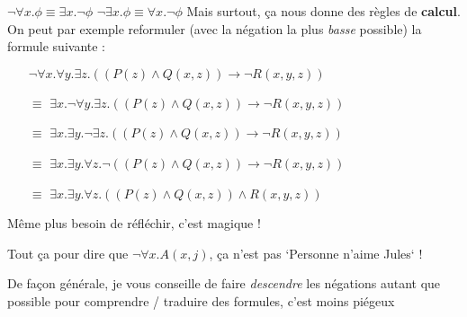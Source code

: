 \begin{frame}

$\neg \forall x. \phi \equiv \exists x. \neg \phi$\newline
$\neg \exists x. \phi \equiv \forall x. \neg \phi$\newline
\pause
Mais surtout, ça nous donne des règles de \textbf{calcul}. On peut par exemple reformuler (avec la négation la plus \textit{basse} possible) la formule suivante : 
\begin{itemize}
\item[] $\neg \forall x. \forall y. \exists z. ((P(z) \wedge Q(x,z)) \rightarrow \neg R(x,y,z))$\pause
\item[$\equiv$] $\exists x. \neg \forall y. \exists z. ((P(z) \wedge Q(x,z)) \rightarrow \neg R(x,y,z))$\pause
\item[$\equiv$] $\exists x. \exists y. \neg \exists z. ((P(z) \wedge Q(x,z)) \rightarrow \neg R(x,y,z))$\pause
\item[$\equiv$] $\exists x. \exists y. \forall z. \neg ((P(z) \wedge Q(x,z)) \rightarrow \neg R(x,y,z))$\pause
\item[$\equiv$] $\exists x. \exists y. \forall z. ((P(z) \wedge Q(x,z)) \wedge R(x,y,z))$\pause
\end{itemize}
Même plus besoin de réfléchir, c'est magique !

\end{frame}


\begin{frame}

Tout ça pour dire que $\neg \forall x. A(x,j)$, ça n'est pas `Personne n'aime Jules` !\pause\newline

De façon générale, je vous conseille de faire \textit{descendre} les négations autant que possible pour comprendre / traduire des formules, c'est moins piégeux

\end{frame}

	



